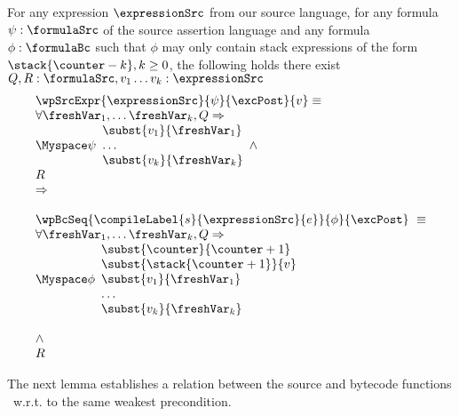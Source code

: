 \begin{exprSrcBcWp2} \label{pogEq:aux:exprSrcBcWp}
 For any expression $\expressionSrc$ from our source language, for any formula $\psi: \formulaSrc$  
of the source assertion language and any formula $\phi: \formulaBc$ such that $\phi$ may only 
contain stack expressions of the form     $\stack{\counter - k}, k \ge 0$, the following holds
there exist $ Q,R:\formulaSrc, v_1 \ldots v_k :\expressionSrc $
$$ \begin{array}{l} \wpSrcExpr{\expressionSrc }{ \psi }{ \excPost}{v} \equiv \\
 \forall \freshVar_1, \ldots  \freshVar_k   ,  Q \Rightarrow \\
 \Myspace \psi 
                                                                             \begin{array}{l}
									        \subst{v_1 }{ \freshVar_1 }  \\
										\ldots \\
										\subst{v_k}{ \freshVar_k } 
									     \end{array}
          \wedge \\ 
	  R  

      
  \\
\Rightarrow \\
 \\

  
	    \wpBcSeq{ \compileLabel{s}{\expressionSrc}{e} }{ \phi }{\excPost} \  \equiv \\ 
            \forall \freshVar_1, \ldots  \freshVar_k ,   Q \Rightarrow \\
	                      \Myspace \phi \begin{array}{l}
                                       \subst{\counter}{\counter + 1}\\
			               \subst{\stack{\counter +1}}{ v }\\
				       \subst{v_1 }{ \freshVar_1 }  \\
				       \ldots \\
				       \subst{v_k}{ \freshVar_k } 
                         \end{array} \\ \\
          \wedge \\ 
	  R 
  \end{array}$$
\end{exprSrcBcWp2}



The next lemma establishes  a relation between the source and bytecode functions \wpName \ w.r.t. to the same weakest precondition. 

